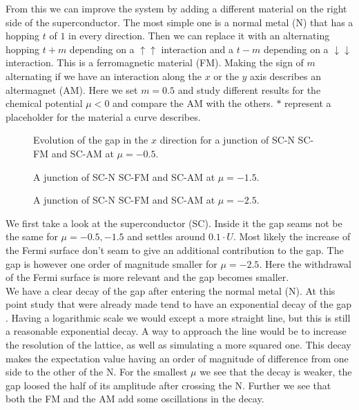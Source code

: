 \documentclass[..\main.tex]{subfile}
\begin{document}
From this we can improve the system by adding a different material on the right side of the superconductor. 
The most simple one is a normal metal (N) that has a hopping $t$ of $1$ in every direction.
Then we can replace it with an alternating hopping $t+m$ depending on a $\uparrow\uparrow$ interaction
and a $t-m$ depending on a $\downarrow\downarrow$ interaction. This is a ferromagnetic material (FM).
Making the sign of $m$ alternating if we have an interaction along the $x$ or the $y$ axis describes an altermagnet (AM).
Here we set $m=0.5$ and study different results for the chemical potential $\mu<0$ and compare the AM
with the others. $\ast$ represent a placeholder for the material a curve describes.\\
\begin{figure}[H]
  \centering
  
  \caption{Evolution of the gap in the $x$ direction for a junction of SC-N SC-FM and SC-AM at $\mu=-0.5$.}
\end{figure}\begin{figure}[H]
  \centering
  
  \caption{A junction of SC-N SC-FM and SC-AM at $\mu=-1.5$.}
\end{figure}
\begin{figure}[H]
  \centering
  
  \caption{A junction of SC-N SC-FM and SC-AM at $\mu=-2.5$.}
\end{figure}
We first take a look at the superconductor (SC). Inside it the gap seams not be the same for $\mu=-0.5,-1.5$
and settles around $0.1\cdot U$. Most likely the increase of the Fermi surface don't seam to give an additional contribution to the gap.
The gap is however one order of magnitude smaller for $\mu=-2.5$. Here the withdrawal of the Fermi surface is more relevant and the 
gap becomes smaller.\\
We have a clear decay of the gap after entering the normal metal (N). At this point 
study that were already made tend to have an exponential decay of the gap \cite{Mjos2019}. Having a logarithmic scale we would
except a more straight line, but this is still a reasonable exponential decay. A way to approach the line would be to increase the 
resolution of the lattice, as well as simulating a more squared one. This decay makes the expectation value having an order of 
magnitude of difference from one side to the other of the N. For the smallest $\mu$ we see that the decay is weaker, the gap loosed
the half of its amplitude after crossing the N. Further we see that both the FM and the AM add some oscillations in the decay. \\
\end{document}
